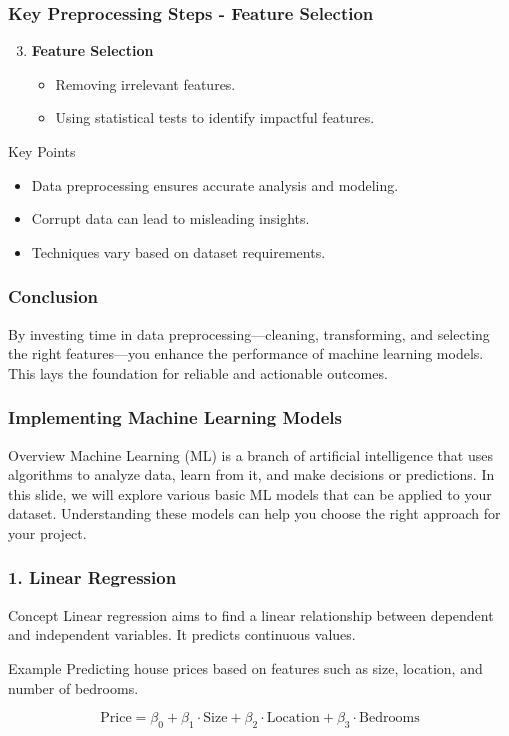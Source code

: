 \documentclass[aspectratio=169]{beamer}
\begin{document}
\begin{frame}[fragile]
    \frametitle{Key Preprocessing Steps - Feature Selection}
    \begin{enumerate}
        \setcounter{enumi}{2} %
        \item \textbf{Feature Selection}
        \begin{itemize}
            \item Removing irrelevant features.
            \item Using statistical tests to identify impactful features.
        \end{itemize}
    \end{enumerate}
    \begin{block}{Key Points}
        \begin{itemize}
            \item Data preprocessing ensures accurate analysis and modeling.
            \item Corrupt data can lead to misleading insights.
            \item Techniques vary based on dataset requirements.
        \end{itemize}
    \end{block}
\end{frame}

\begin{frame}[fragile]
    \frametitle{Conclusion}
    By investing time in data preprocessing—cleaning, transforming, and selecting the right features—you enhance the performance of machine learning models. This lays the foundation for reliable and actionable outcomes. 
\end{frame}

\begin{frame}[fragile]
    \frametitle{Implementing Machine Learning Models}
    \begin{block}{Overview}
        Machine Learning (ML) is a branch of artificial intelligence that uses algorithms to analyze data, learn from it, and make decisions or predictions. 
        In this slide, we will explore various basic ML models that can be applied to your dataset. 
        Understanding these models can help you choose the right approach for your project.
    \end{block}
\end{frame}

\begin{frame}[fragile]
    \frametitle{1. Linear Regression}
    \begin{block}{Concept}
        Linear regression aims to find a linear relationship between dependent and independent variables. It predicts continuous values.
    \end{block}
    \begin{block}{Example}
        Predicting house prices based on features such as size, location, and number of bedrooms.
    \end{block}
    \begin{equation}
        \text{Price} = \beta_0 + \beta_1 \cdot \text{Size} + \beta_2 \cdot \text{Location} + \beta_3 \cdot \text{Bedrooms}
    \end{equation}
\end{frame}
\end{document}
